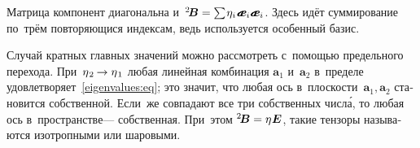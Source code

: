 \begin{otherlanguage}{russian}
\vspace{-0.3em} \noindent
Матрица компонент диагональна и~${{^2\!\bm{B}} = \sum \hspace{-0.2ex} \eigenvalue_{\hspace{-0.15ex}i} \hspace{.1ex} \mathboldae_i \mathboldae_i}$. Здесь идёт суммирование по~трём повторяющися индексам, ведь используется особенный базис.

Случай кратных главных значений можно рассмотреть с~помощью предельного перехода. При~${\eta\hspace{.1ex}_2 \hspace{-0.16ex} \to \eta\hspace{.1ex}_1}$ любая линейная комбинация ${\bm{a}_1}$ и~${\bm{a}_2}$ в~пределе удовлетворяет~\eqref{eigenvalues:eq}; это значит, что любая ось в~плоскости~${\bm{a}_1, \bm{a}_2}$ становится собственной. Если~же совпадают все три собственных числ\'{а}, то любая ось в~пространстве\:--- собственная. При~этом ${{^2\!\bm{B}} = \eta\hspace{.1ex} \bm{E}}$, такие тензоры называются изотропными или шаровыми.

\end{otherlanguage}



\label{para:rotationtensor}

